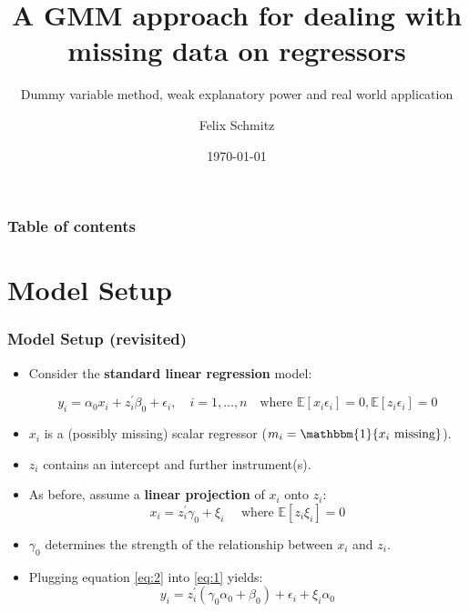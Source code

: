 \documentclass[aspectratio=1610]{beamer}
\title{A GMM approach for dealing with missing data on regressors}
\subtitle{Dummy variable method, weak explanatory power and real world application}
\date{\today}
\author{Felix Schmitz}
\begin{document}

\begin{frame}[plain]
	\titlepage
\end{frame}

\begin{framecontent}
	\frametitle{Table of contents}
\end{framecontent}

\section{Model Setup}

\begin{frame}
    \frametitle{Model Setup (revisited)}
    \begin{itemize}
        \item<1-> Consider the \textbf{standard linear regression} model:

        \begin{equation}\label{eq:1}
            y_i = \alpha_0 x_i + z_i^{\prime} \beta_0 + \epsilon_i, \quad i= 1,\ldots,n \quad \text{where }  \mathbb{E}[x_i \epsilon_i] = 0, \mathbb{E}[z_i \epsilon_i] = 0
        \end{equation}

        \item<1-> $x_i$ is a (possibly missing) scalar regressor (\( m_i = \mathbbm{1}\{x_i \text{ missing}\} \)).
		\item<1-> $z_i$ contains an intercept and further instrument(s).
        \item<2-> As before, assume a \textbf{linear projection} of $x_i$ onto $z_i$:
        \begin{equation}\label{eq:2}
            x_i = z_i^{\prime} \gamma_0 + \xi_i \quad \text{ where } \mathbb{E}[z_i \xi_i] = 0
        \end{equation}

        \item<3-> $\gamma_0$ determines the strength of the relationship between $x_i$ and $z_i$.
        \item<3-> Plugging equation \eqref{eq:2} into \eqref{eq:1} yields:
        \begin{equation}\label{eq:3}
            y_i = z_i^{\prime} (\gamma_0 \alpha_0 + \beta_0) + \epsilon_i + \xi_i \alpha_0
        \end{equation}
    \end{itemize}
\end{frame}
\end{document}
